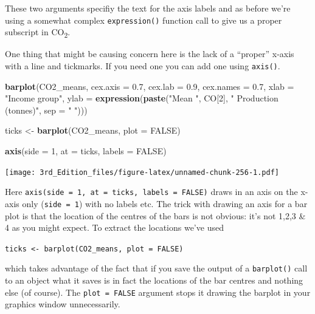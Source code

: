 \documentclass[
]{book}
\newenvironment{Shaded}{\begin{snugshade}}{\end{snugshade}}
\newcommand{\DataTypeTok}[1]{\textcolor[rgb]{0.13,0.29,0.53}{#1}}
\newcommand{\DecValTok}[1]{\textcolor[rgb]{0.00,0.00,0.81}{#1}}
\newcommand{\FloatTok}[1]{\textcolor[rgb]{0.00,0.00,0.81}{#1}}
\newcommand{\KeywordTok}[1]{\textcolor[rgb]{0.13,0.29,0.53}{\textbf{#1}}}
\newcommand{\NormalTok}[1]{#1}
\newcommand{\OtherTok}[1]{\textcolor[rgb]{0.56,0.35,0.01}{#1}}
\newcommand{\StringTok}[1]{\textcolor[rgb]{0.31,0.60,0.02}{#1}}
\begin{document}
These two arguments specifiy the text for the axis labels and as before we're using a somewhat complex \texttt{expression()} function call to give us a proper subscript in CO\textsubscript{2}.

One thing that might be causing concern here is the lack of a ``proper'' x-axis with a line and tickmarks. If you need one you can add one using \texttt{axis()}.

\begin{Shaded}
\begin{Highlighting}[]

\KeywordTok{barplot}\NormalTok{(CO2_means,}
        \DataTypeTok{cex.axis =} \FloatTok{0.7}\NormalTok{,}
        \DataTypeTok{cex.lab =} \FloatTok{0.9}\NormalTok{,}
        \DataTypeTok{cex.names =} \FloatTok{0.7}\NormalTok{,}
        \DataTypeTok{xlab =} \StringTok{"Income group"}\NormalTok{,}
        \DataTypeTok{ylab =} \KeywordTok{expression}\NormalTok{(}\KeywordTok{paste}\NormalTok{(}\StringTok{"Mean "}\NormalTok{, CO[}\DecValTok{2}\NormalTok{], }\StringTok{" Production (tonnes)"}\NormalTok{, }\DataTypeTok{sep =} \StringTok{" "}\NormalTok{)))}

\NormalTok{ticks <-}\StringTok{ }\KeywordTok{barplot}\NormalTok{(CO2_means, }\DataTypeTok{plot =} \OtherTok{FALSE}\NormalTok{)}

\KeywordTok{axis}\NormalTok{(}\DataTypeTok{side =} \DecValTok{1}\NormalTok{, }\DataTypeTok{at =}\NormalTok{ ticks, }\DataTypeTok{labels =} \OtherTok{FALSE}\NormalTok{)}
\end{Highlighting}
\end{Shaded}

\texttt{[image: 3rd\_Edition\_files/figure-latex/unnamed-chunk-256-1.pdf]}

Here \texttt{axis(side\ =\ 1,\ at\ =\ ticks,\ labels\ =\ FALSE)} draws in an axis on the x-axis only (\texttt{side\ =\ 1}) with no labels etc. The trick with drawing an axis for a bar plot is that the location of the centres of the bars is not obvious: it's not 1,2,3 \& 4 as you might expect. To extract the locations we've used

\texttt{ticks\ \textless{}-\ barplot(CO2\_means,\ plot\ =\ FALSE)}

which takes advantage of the fact that if you save the output of a \texttt{barplot()} call to an object what it saves is in fact the locations of the bar centres and nothing else (of course). The \texttt{plot\ =\ FALSE} argument stops it drawing the barplot in your graphics window unnecessarily.
\end{document}
